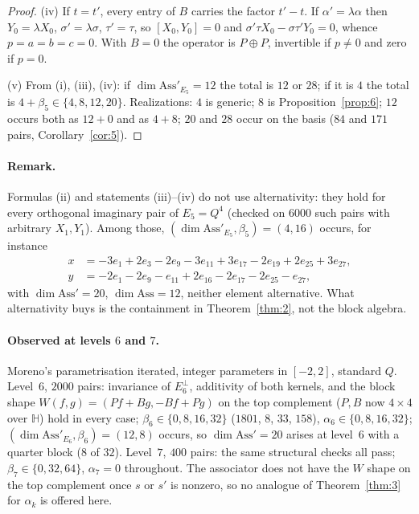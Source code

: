 \documentclass{baustms}
\theoremstyle{cupthm}
\numberwithin{equation}{section}
\newcommand{\Ass}{\mathrm{Ass}}
\newcommand{\HH}{\mathbb{H}}
\begin{document}
\begin{proof}
(iv) If $t=t'$, every entry of $B$ carries the factor $t'-t$. If $\alpha'=\lambda\alpha$ then $Y_0=\lambda X_0$, $\sigma'=\lambda\sigma$, $\tau'=\tau$, so $[X_0,Y_0]=0$ and $\sigma'\tau X_0-\sigma\tau' Y_0=0$, whence $p=a=b=c=0$. With $B=0$ the operator is $P\oplus P$, invertible if $p\neq 0$ and zero if $p=0$.

(v) From (i), (iii), (iv): if $\dim\Ass'_{E_5}=12$ the total is $12$ or $28$; if it is $4$ the total is $4+\beta_5\in\{4,8,12,20\}$. Realizations: $4$ is generic; $8$ is Proposition~\ref{prop:6}; $12$ occurs both as $12+0$ and as $4+8$; $20$ and $28$ occur on the basis ($84$ and $171$ pairs, Corollary~\ref{cor:5}).
\end{proof}

\paragraph{Remark.}
Formulas (ii) and statements (iii)--(iv) do not use alternativity: they hold for every orthogonal imaginary pair of $E_5=Q^4$ (checked on $6000$ such pairs with arbitrary $X_1,Y_1$). Among those, $(\dim\Ass'_{E_5},\beta_5)=(4,16)$ occurs, for instance
\begin{align*}
x&=-3e_1+2e_3-2e_9-3e_{11}+3e_{17}-2e_{19}+2e_{25}+3e_{27},\\
y&=-2e_1-2e_9-e_{11}+2e_{16}-2e_{17}-2e_{25}-e_{27},
\end{align*}
with $\dim\Ass'=20$, $\dim\Ass=12$, neither element alternative. What alternativity buys is the containment in Theorem~\ref{thm:2}, not the block algebra.

\paragraph{Observed at levels $6$ and $7$.}
Moreno's parametrisation iterated, integer parameters in $[-2,2]$, standard $Q$. Level~$6$, $2000$ pairs: invariance of $E_6^\perp$, additivity of both kernels, and the block shape $W(f,g)=(Pf+Bg,-Bf+Pg)$ on the top complement ($P,B$ now $4\times 4$ over $\HH$) hold in every case; $\beta_6\in\{0,8,16,32\}$ ($1801$, $8$, $33$, $158$), $\alpha_6\in\{0,8,16,32\}$; $(\dim\Ass'_{E_6},\beta_6)=(12,8)$ occurs, so $\dim\Ass'=20$ arises at level~$6$ with a quarter block ($8$ of $32$). Level~$7$, $400$ pairs: the same structural checks all pass; $\beta_7\in\{0,32,64\}$, $\alpha_7=0$ throughout. The associator does not have the $W$ shape on the top complement once $s$ or $s'$ is nonzero, so no analogue of Theorem~\ref{thm:3} for $\alpha_k$ is offered here.
\end{document}
